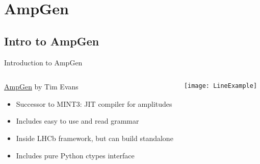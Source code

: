\documentclass[aspectratio=169, smaller]{beamer}
\begin{document}
\section{AmpGen}
\subsection{Intro to AmpGen}
\begin{frame}{Introduction to AmpGen}
    \begin{columns}
        \begin{block}{\href{https://gitlab.cern.ch/lhcb/Gauss/tree/LHCBGAUSS-1058.AmpGenDev/Gen/AmpGen}{AmpGen} by Tim Evans}
            \begin{itemize}
                \item Successor to MINT3: JIT compiler for amplitudes
                \item Includes easy to use and read grammar
                \item Inside LHCb framework, but can build standalone 
                \item Includes pure Python ctypes interface
            \end{itemize}
        \end{block}
        \texttt{[image: LineExample]}
    \end{columns}
    
\end{frame}
\end{document}
